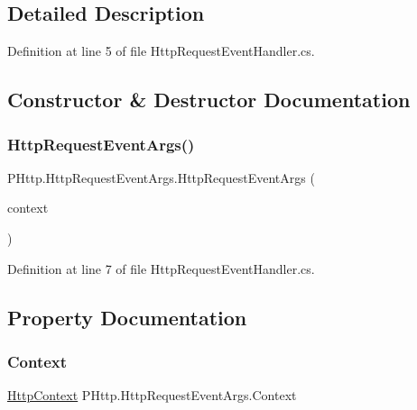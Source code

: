 \subsection{Detailed Description}


Definition at line 5 of file Http\+Request\+Event\+Handler.\+cs.



\subsection{Constructor \& Destructor Documentation}
\mbox{\label{class_p_http_1_1_http_request_event_args_aab4d9a817dec66911fa8f3e70d691ac6}} 
\subsubsection{\texorpdfstring{Http\+Request\+Event\+Args()}{HttpRequestEventArgs()}}
{\footnotesize\ttfamily P\+Http.\+Http\+Request\+Event\+Args.\+Http\+Request\+Event\+Args (\begin{DoxyParamCaption}\item[{\hyperlink{class_p_http_1_1_http_context}{Http\+Context}}]{context }\end{DoxyParamCaption})}



Definition at line 7 of file Http\+Request\+Event\+Handler.\+cs.



\subsection{Property Documentation}
\mbox{\label{class_p_http_1_1_http_request_event_args_a9fed5e43ed1cac4ed7e001c68df740bb}} 
\subsubsection{\texorpdfstring{Context}{Context}}
{\footnotesize\ttfamily \hyperlink{class_p_http_1_1_http_context}{Http\+Context} P\+Http.\+Http\+Request\+Event\+Args.\+Context\hspace{0.3cm}{\ttfamily [get]}}



